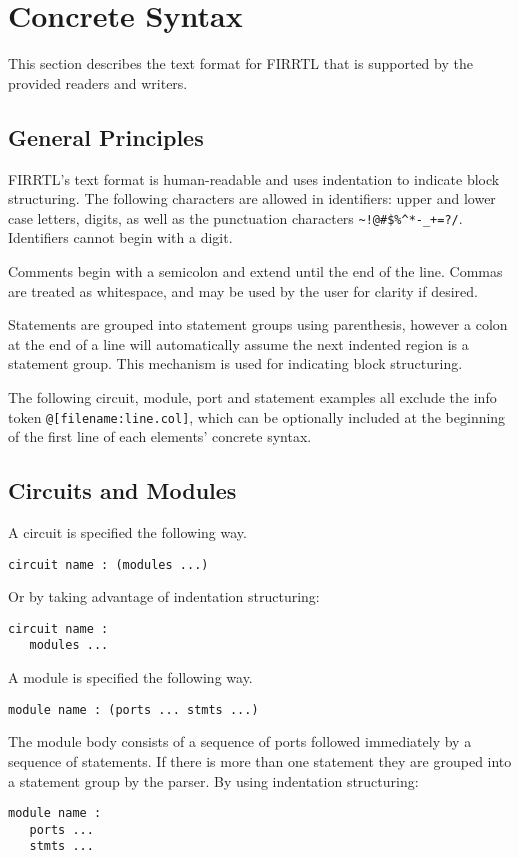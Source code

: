 \documentclass[12pt]{article}
\begin{document}
\section{Concrete Syntax}\label{concrete}
This section describes the text format for FIRRTL that is supported by the provided readers and writers.

\subsection*{General Principles}
FIRRTL's text format is human-readable and uses indentation to indicate block structuring.
The following characters are allowed in identifiers: upper and lower case letters, digits, as well as the punctuation characters \verb|~!@#$%^*-_+=?/|.
Identifiers cannot begin with a digit. 

Comments begin with a semicolon and extend until the end of the line.
Commas are treated as whitespace, and may be used by the user for clarity if desired. 

Statements are grouped into statement groups using parenthesis, however a colon at the end of a line will automatically assume the next indented region is a statement group.
This mechanism is used for indicating block structuring. 

The following circuit, module, port and statement examples all exclude the info token \verb|@[filename:line.col]|, which can be optionally included at the beginning of the first line of each elements' concrete syntax.

\subsection*{Circuits and Modules}
A circuit is specified the following way.
\begin{verbatim}
circuit name : (modules ...)
\end{verbatim}
Or by taking advantage of indentation structuring:
\begin{verbatim}
circuit name :
   modules ...
\end{verbatim}

A module is specified the following way.
\begin{verbatim}
module name : (ports ... stmts ...)
\end{verbatim}
The module body consists of a sequence of ports followed immediately by a sequence of statements.
If there is more than one statement they are grouped into a statement group by the parser. 
By using indentation structuring:
\begin{verbatim}
module name :
   ports ...
   stmts ...
\end{verbatim}
\end{document}
